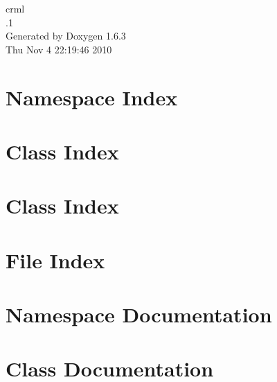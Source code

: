 \documentclass[a4paper]{book}
\begin{document}
\hypersetup{pageanchor=false}
\begin{titlepage}
\vspace*{7cm}
\begin{center}
{\Large crml \\[1ex]\large .1 }\\
\vspace*{1cm}
{\large Generated by Doxygen 1.6.3}\\
\vspace*{0.5cm}
{\small Thu Nov 4 22:19:46 2010}\\
\end{center}
\end{titlepage}
\clearemptydoublepage
{}
\tableofcontents
\clearemptydoublepage
{}
\hypersetup{pageanchor=true}
\chapter{Namespace Index}

\chapter{Class Index}

\chapter{Class Index}

\chapter{File Index}

\chapter{Namespace Documentation}













\chapter{Class Documentation}
























\end{document}

